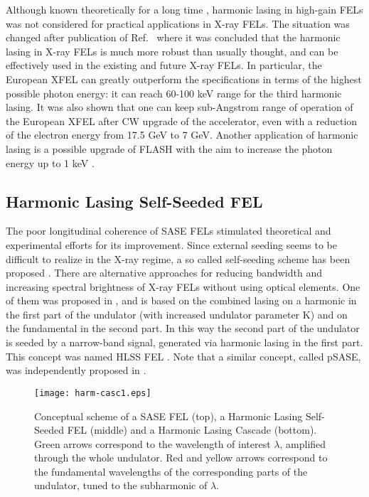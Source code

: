 \documentclass[aps,prl,preprint,groupedaddress,preprintnumbers]{revtex4}
\begin{document}
Although known theoretically for a long time \cite{murphy,hg-2,kim-1,mcneil}, harmonic lasing in high-gain FELs
was not considered for practical applications in X-ray FELs.
The situation was changed after publication of Ref.~\cite{sy-harm} where it was concluded that
the harmonic lasing in X-ray FELs is much more robust than usually thought, and can be effectively used in
the existing and future X-ray FELs. In particular, the European XFEL 
can greatly outperform
the specifications \cite{euro-xfel-tdr}
in terms of the highest possible photon energy: it can reach 60-100 keV range for the
third harmonic lasing.
It was also shown \cite{cw} that one can keep sub-Angstrom range of operation of the European XFEL
after CW upgrade
of the accelerator, even with a reduction of the electron energy from 17.5 GeV to 7 GeV.
Another application of harmonic lasing is a possible upgrade of FLASH with the aim to
increase the photon energy
up to 1 keV \cite{fl-harm-las}.


\subsection{Harmonic Lasing Self-Seeded FEL}

The poor longitudinal coherence of SASE FELs stimulated theoretical and experimental efforts for its improvement.
Since external seeding seems to be difficult to realize in the X-ray regime, a so called self-seeding scheme has been proposed
\cite{ss-soft,ss-wake}.
There are alternative approaches for reducing bandwidth and increasing spectral brightness of X-ray FELs without using
optical elements. One of them was proposed in \cite{sy-harm}, and is based on the combined lasing on a harmonic in
the first part of the undulator
(with increased undulator parameter K)
and on the fundamental in the second part. In this way the second part of the undulator is seeded by a narrow-band signal,
generated via harmonic lasing in the first part.
This concept was named HLSS FEL \cite{hlss}. Note that a similar concept, called pSASE, was independently proposed in \cite{psase}.


\begin{figure}[tb]

\texttt{[image: harm-casc1.eps]}

\caption{\small Conceptual scheme of a SASE FEL (top), a Harmonic Lasing Self-Seeded FEL (middle) and a Harmonic Lasing Cascade (bottom). Green arrows correspond to the wavelength of interest $\lambda$, amplified through the whole undulator. Red and yellow arrows correspond to the fundamental wavelengths of the corresponding parts of the undulator, tuned to the subharmonic of $\lambda$.}

\label{hlss}
\end{figure}
\end{document}
